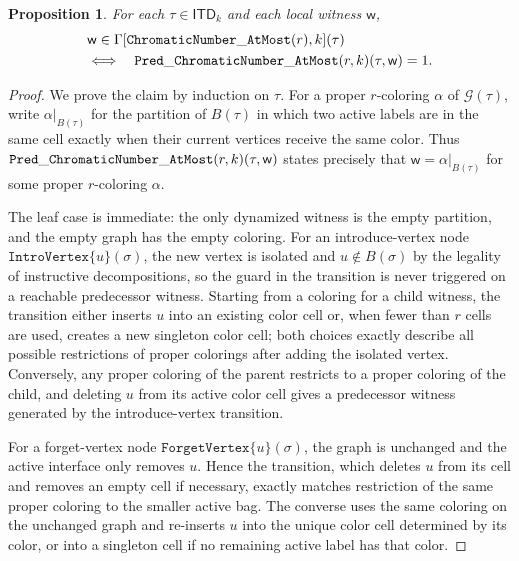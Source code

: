 \documentclass[11pt,a4paper]{article}
\newtheorem{proposition}[theorem]{Proposition}
\newcommand{\truevalue}{1}
\newcommand{\treewidthvalue}{k}
\newcommand{\decompositiongraph}[1]{\mathcal{G}(#1)}
\newcommand{\introvertextype}[1]{\mathtt{IntroVertex}\{#1\}}
\newcommand{\forgetvertextype}[1]{\mathtt{ForgetVertex}\{#1\}}
\newcommand{\topbagname}{B}
\newcommand{\topbag}[1]{\topbagname(#1)}
\newcommand{\allabstractdecompositionstreewidth}[1]{\mathsf{ITD}_{#1}}
\newcommand{\abstractdecomposition}{\tau}
\newcommand{\sigmaabstractdecomposition}{\sigma}
\newcommand{\vertexone}{u}
\newcommand{\awitness}{\mathsf{w}}
\newcommand{\dpNamePart}[1]{\mbox{\normalfont\ttfamily #1}}
\newcommand{\dynamizationfunctionname}[1]{\Gamma[{#1}]}
\newcommand{\dynamizationfunction}[2]{\dynamizationfunctionname{#1,#2}}
\newcommand{\numbercolors}{r}
\newcommand{\predicateColorable}[2]{\dpNamePart{Pred}\_\allowbreak\dpNamePart{ChromaticNumber}\_\allowbreak\dpNamePart{AtMost}(#1,#2)}
\newcommand{\chromaticnumberAtMostCore}[1]{\dpNamePart{ChromaticNumber}\_\allowbreak\dpNamePart{AtMost}(#1)}
\newcommand{\cnc}{\chromaticnumberAtMostCore{\numbercolors}}
\newcommand{\cnp}{\predicateColorable{\numbercolors}{\treewidthvalue}}
\begin{document}
\begin{proposition}
\label{proposition:PredicateColorable}
For each $\abstractdecomposition\in \allabstractdecompositionstreewidth{\treewidthvalue}$
and each local witness $\awitness$,
\[
\begin{aligned}
&\awitness \in \dynamizationfunction{\cnc}{\treewidthvalue}(\abstractdecomposition)\\
&\Longleftrightarrow\quad
\cnp(\abstractdecomposition,\awitness)=\truevalue.
\end{aligned}
\]
\end{proposition}
\begin{proof}
We prove the claim by induction on $\abstractdecomposition$. For a proper $\numbercolors$-coloring $\alpha$ of $\decompositiongraph{\abstractdecomposition}$, write $\alpha|_{\topbag{\abstractdecomposition}}$ for the partition of $\topbag{\abstractdecomposition}$ in which two active labels are in the same cell exactly when their current vertices receive the same color. Thus $\cnp(\abstractdecomposition,\awitness)$ states precisely that $\awitness=\alpha|_{\topbag{\abstractdecomposition}}$ for some proper $\numbercolors$-coloring $\alpha$.

The leaf case is immediate: the only dynamized witness is the empty partition, and the empty graph has the empty coloring. For an introduce-vertex node $\introvertextype{\vertexone}(\sigmaabstractdecomposition)$, the new vertex is isolated and $\vertexone\notin\topbag{\sigmaabstractdecomposition}$ by the legality of instructive decompositions, so the guard in the transition is never triggered on a reachable predecessor witness. Starting from a coloring for a child witness, the transition either inserts $\vertexone$ into an existing color cell or, when fewer than $\numbercolors$ cells are used, creates a new singleton color cell; both choices exactly describe all possible restrictions of proper colorings after adding the isolated vertex. Conversely, any proper coloring of the parent restricts to a proper coloring of the child, and deleting $\vertexone$ from its active color cell gives a predecessor witness generated by the introduce-vertex transition.

For a forget-vertex node $\forgetvertextype{\vertexone}(\sigmaabstractdecomposition)$, the graph is unchanged and the active interface only removes $\vertexone$. Hence the transition, which deletes $\vertexone$ from its cell and removes an empty cell if necessary, exactly matches restriction of the same proper coloring to the smaller active bag. The converse uses the same coloring on the unchanged graph and re-inserts $\vertexone$ into the unique color cell determined by its color, or into a singleton cell if no remaining active label has that color.


\end{proof}
\end{document}

